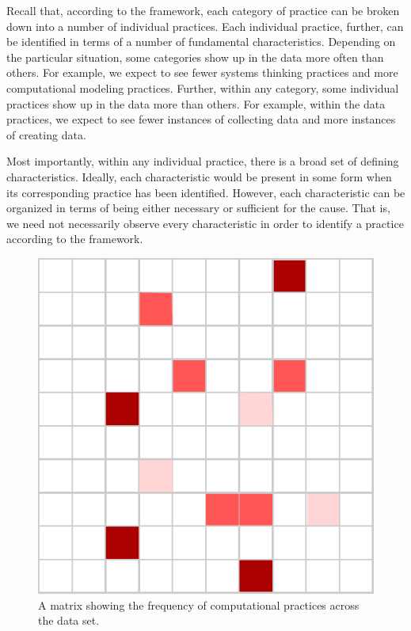 \documentclass{msuphddissertation}
\begin{document}
\begin{doublespace}
Recall that, according to the framework, each category of practice can be broken down into a number of individual practices.  Each individual practice, further, can be identified in terms of a number of fundamental characteristics.  Depending on the particular situation, some categories show up in the data more often than others.  For example, we expect to see fewer systems thinking practices and more computational modeling practices.  Further, within any category, some individual practices show up in the data more than others.  For example, within the data practices, we expect to see fewer instances of collecting data and more instances of creating data.

Most importantly, within any individual practice, there is a broad set of defining characteristics.  Ideally, each characteristic would be present in some form when its corresponding practice has been identified.  However, each characteristic can be organized in terms of being either necessary or sufficient for the cause.  That is, we need not necessarily observe every characteristic in order to identify a practice according to the framework.

\begin{figure}[ht]\centering
\includegraphics[scale=1]{./images/matrix.pdf}
\caption{A matrix showing the frequency of computational practices across the data set.}
\end{figure}


\end{doublespace}
\end{document}

